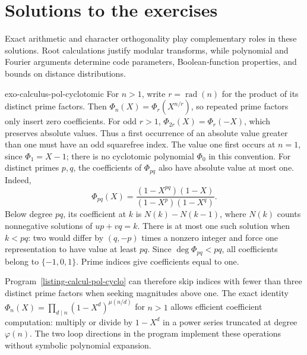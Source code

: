 \clearpage
\section{Solutions to the exercises}
\label{sec-solutions-6-finite-fields}

Exact arithmetic and character orthogonality play complementary roles in
these solutions. Root calculations justify modular transforms, while
polynomial and Fourier arguments determine code parameters, Boolean-function
properties, and bounds on distance distributions.

\begin{correction}{exo-calculus-pol-cyclotomic}
For $n>1$, write $r=\operatorname{rad}(n)$ for the product of its distinct
prime factors. Then $\Phi_n(X)=\Phi_r(X^{n/r})$, so repeated prime
factors only insert zero coefficients. For odd $r>1$,
$\Phi_{2r}(X)=\Phi_r(-X)$, which preserves absolute values. Thus a first
occurrence of an absolute value greater than one must have an odd
squarefree index. The value one first occurs at $n=1$, since
$\Phi_1=X-1$; there is no cyclotomic polynomial $\Phi_0$ in this convention.
For distinct primes $p,q$, the coefficients of $\Phi_{pq}$ also have
absolute value at most one. Indeed,
\[
 \Phi_{pq}(X)=\frac{(1-X^{pq})(1-X)}{(1-X^p)(1-X^q)}.
\]
Below degree $pq$, its coefficient at $k$ is $N(k)-N(k-1)$, where
$N(k)$ counts nonnegative solutions of $up+vq=k$. There is at most
one such solution when $k<pq$: two would differ by $(q,-p)$ times
a nonzero integer and force one representation to have value at
least $pq$. Since $\deg\Phi_{pq}<pq$, all coefficients belong to
$\{-1,0,1\}$. Prime indices give coefficients equal to one.

Program~\ref{listing-calcul-pol-cyclo} can therefore skip indices with
fewer than three distinct prime factors when seeking magnitudes above
one. The exact identity
$\Phi_n(X)=\prod_{d\mid n}(1-X^d)^{\mu(n/d)}$ for $n>1$
allows efficient coefficient computation: multiply or divide by
$1-X^d$ in a power series truncated at degree $\varphi(n)$.
The two loop directions in the program implement these operations
without symbolic polynomial expansion.


\end{correction}
